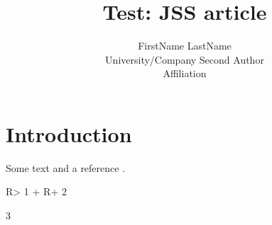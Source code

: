 \documentclass[
  nojss]{jss}
\author{
FirstName LastName\\University/Company \And Second Author\\Affiliation
}
\title{Test: JSS article}
\begin{document}
\hypertarget{introduction}{%
\section{Introduction}\label{introduction}}

Some text and a reference \citep{JSSv059i10}.

\begin{CodeChunk}

\begin{CodeInput}
R> 1 +
R+   2
\end{CodeInput}

\begin{CodeOutput}
[1] 3
\end{CodeOutput}
\end{CodeChunk}


\end{document}
